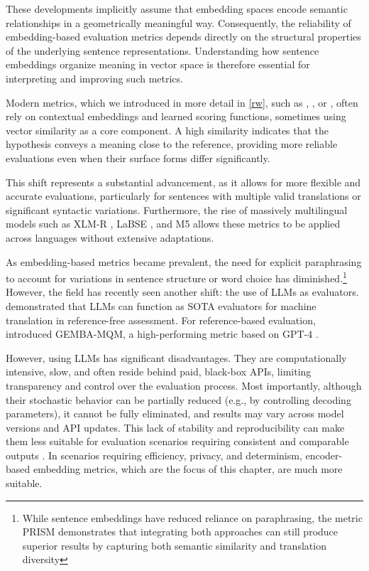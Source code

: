 These developments implicitly assume that embedding spaces encode semantic relationships in a geometrically meaningful way. Consequently, the reliability of embedding-based evaluation metrics depends directly on the structural properties of the underlying sentence representations. Understanding how sentence embeddings organize meaning in vector space is therefore essential for interpreting and improving such metrics.

Modern metrics, which we introduced in more detail in \cref{rw}, such as \comet \citep{rei-etal-2020-comet}, \bertscore \citep{bertscore:2020}, or \bleurt \citep{sellam2020bleurt}, often rely on contextual embeddings and learned scoring functions, sometimes using vector similarity as a core component. A high similarity indicates that the hypothesis conveys a meaning close to the reference, providing more reliable evaluations even when their surface forms differ significantly.

This shift represents a substantial advancement, as it allows for more flexible and accurate evaluations, particularly for sentences with multiple valid translations or significant syntactic variations. Furthermore, the rise of massively multilingual models such as XLM-R \citep{xlm-r}, LaBSE \citep{feng-etal-2022-language}, and M5 \citep{wang2024multilingual} allows these metrics to be applied across languages without extensive adaptations.

As embedding-based metrics became prevalent, the need for explicit paraphrasing to account for variations in sentence structure or word choice has diminished.\footnote{While sentence embeddings have reduced reliance on paraphrasing, the metric PRISM \citep{prism} demonstrates that integrating both approaches can still produce superior results by capturing both semantic similarity and translation diversity} However, the field has recently seen another shift: the use of LLMs as evaluators. \cite{kocmi-federmann-2023-large} demonstrated that LLMs can function as SOTA evaluators for machine translation in reference-free assessment. For reference-based evaluation, \cite{kocmi-federmann-2023-gemba} introduced GEMBA-MQM, a high-performing metric based on GPT-4 \citep{gpt4}.

However, using LLMs has significant disadvantages. They are computationally intensive, slow, and often reside behind paid, black-box APIs, limiting transparency and control over the evaluation process. Most importantly, although their stochastic behavior can be partially reduced (e.g., by controlling decoding parameters), it cannot be fully eliminated, and results may vary across model versions and API updates. This lack of stability and reproducibility can make them less suitable for evaluation scenarios requiring consistent and comparable outputs \citep{shen-etal-2023-large}. In scenarios requiring efficiency, privacy, and determinism, encoder-based embedding metrics, which are the focus of this chapter, are much more suitable. 

